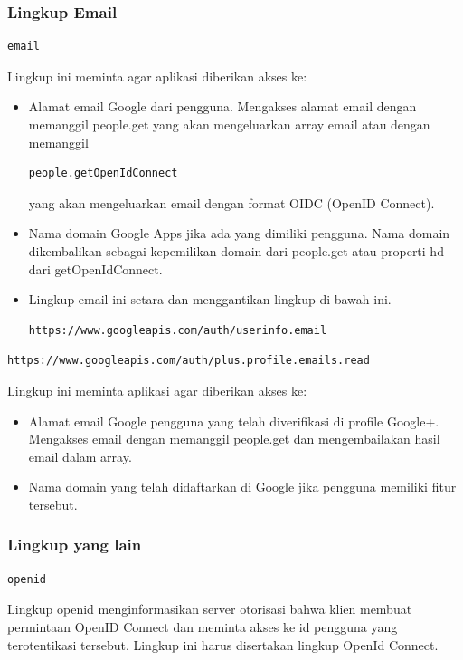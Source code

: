 \subsubsection{Lingkup Email}
\begin{lstlisting}
email
\end{lstlisting}
Lingkup ini meminta agar aplikasi diberikan akses ke:
\begin{itemize}
\item
Alamat email Google dari pengguna. Mengakses alamat email dengan memanggil people.get yang akan mengeluarkan array email atau dengan memanggil
\begin{lstlisting}
people.getOpenIdConnect
\end{lstlisting}
yang akan mengeluarkan email dengan format OIDC (OpenID Connect).
\item
Nama domain Google Apps jika ada yang dimiliki pengguna. Nama domain dikembalikan sebagai kepemilikan domain dari people.get atau properti hd dari getOpenIdConnect.
\item
Lingkup email ini setara dan menggantikan lingkup di bawah ini.
\begin{lstlisting}
https://www.googleapis.com/auth/userinfo.email
\end{lstlisting}
\end{itemize}
\begin{lstlisting}
https://www.googleapis.com/auth/plus.profile.emails.read
\end{lstlisting}
Lingkup ini meminta aplikasi agar diberikan akses ke:
\begin{itemize}
\item
Alamat email Google pengguna yang telah diverifikasi di profile Google+. Mengakses email dengan memanggil people.get dan mengembailakan hasil email dalam array.
\item
Nama domain yang telah didaftarkan di Google jika pengguna memiliki fitur tersebut.
\end{itemize}

\subsubsection{Lingkup yang lain}
\begin{lstlisting}
openid
\end{lstlisting}
Lingkup openid menginformasikan server otorisasi bahwa klien membuat permintaan OpenID Connect dan meminta akses ke id pengguna yang terotentikasi tersebut. Lingkup ini harus disertakan lingkup OpenId Connect.


